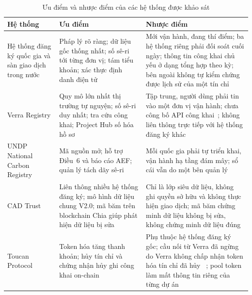 \begin{table}[htbp]
    \centering
    \caption{Ưu điểm và nhược điểm của các hệ thống được khảo sát}
    \label{tab:ks-uunhuoc}
    \small
    \renewcommand{\arraystretch}{1.2}
    \begin{tabularx}{\textwidth}{|p{2.6cm}|X|X|}
        \hline
        \textbf{Hệ thống} & \textbf{Ưu điểm} & \textbf{Nhược điểm} \\
        \hline
        Hệ thống đăng ký quốc gia và sàn giao dịch trong nước & Pháp lý rõ ràng; dữ liệu gốc thống nhất; số sê-ri tới từng đơn vị; tám tiểu khoản; xác thực định danh điện tử~\cite{vietnam2026thongtu11} & Mới vận hành, đang thí điểm; ba hệ thống riêng phải đối soát cuối ngày; thông tin công khai chủ yếu ở dạng tổng hợp theo kỳ; bên ngoài không tự kiểm chứng được lịch sử của một tín chỉ \\
        \hline
        Verra Registry & Quy mô lớn nhất thị trường tự nguyện; số sê-ri duy nhất; tra cứu công khai; Project Hub số hóa hồ sơ~\cite{verra2024vcs} \cite{verra2024projecthub} & Tập trung, người dùng phải tin vào một đơn vị vận hành; chưa công bố API công khai~\cite{verraregistry}; không liên thông trực tiếp với hệ thống đăng ký khác \\
        \hline
        UNDP National Carbon Registry & Mã nguồn mở; hỗ trợ Điều~6 và báo cáo AEF; quản lý tách dãy sê-ri~\cite{undp2024nationalregistry} & Mỗi quốc gia phải tự triển khai, vận hành hạ tầng đám mây; sổ cái vẫn do một bên quản lý \\
        \hline
        CAD Trust & Liên thông nhiều hệ thống đăng ký; mô hình dữ liệu chung V2.0; mã băm trên blockchain Chia giúp phát hiện dữ liệu bị sửa~\cite{cadtrust2025datamodel} & Chỉ là lớp siêu dữ liệu, không ghi quyền sở hữu và không thực hiện giao dịch; mã băm chứng minh dữ liệu không bị sửa, không chứng minh dữ liệu đúng \\
        \hline
        Toucan Protocol & Token hóa tăng thanh khoản; hủy tín chỉ và chứng nhận hủy ghi công khai on-chain~\cite{toucan2025docs} & Phụ thuộc hệ thống đăng ký gốc; cầu nối từ Verra đã ngừng do Verra không chấp nhận token hóa tín chỉ đã hủy~\cite{toucan2025docs} \cite{spglobal2022verra}; pool token làm mất thông tin riêng của từng dự án \\
        \hline
    \end{tabularx}
\end{table}
\FloatBarrier

